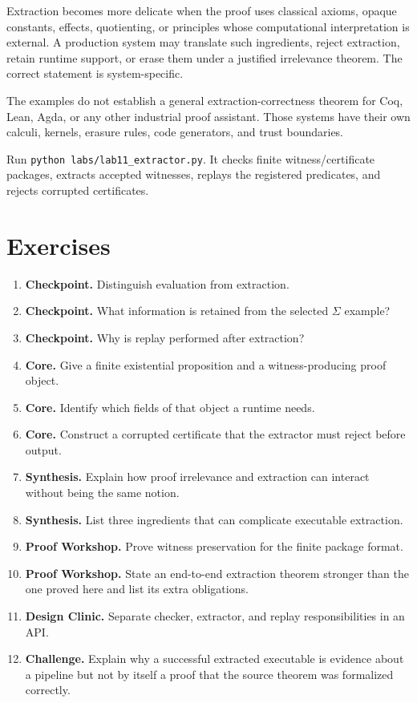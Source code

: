 Extraction becomes more delicate when the proof uses classical axioms, opaque constants, effects, quotienting, or principles whose computational interpretation is external. A production system may translate such ingredients, reject extraction, retain runtime support, or erase them under a justified irrelevance theorem. The correct statement is system-specific.



\begin{warningbox}
The examples do not establish a general extraction-correctness theorem for Coq, Lean, Agda, or any other industrial proof assistant. Those systems have their own calculi, kernels, erasure rules, code generators, and trust boundaries.
\end{warningbox}

\begin{labbox}
Run \texttt{python labs/lab11_extractor.py}. It checks finite witness/certificate packages, extracts accepted witnesses, replays the registered predicates, and rejects corrupted certificates.
\end{labbox}

\section*{Exercises}
\begin{enumerate}[label=\textbf{11.\arabic*.}]
\item \textbf{Checkpoint.} Distinguish evaluation from extraction.
\item \textbf{Checkpoint.} What information is retained from the selected $\Sigma$ example?
\item \textbf{Checkpoint.} Why is replay performed after extraction?
\item \textbf{Core.} Give a finite existential proposition and a witness-producing proof object.
\item \textbf{Core.} Identify which fields of that object a runtime needs.
\item \textbf{Core.} Construct a corrupted certificate that the extractor must reject before output.
\item \textbf{Synthesis.} Explain how proof irrelevance and extraction can interact without being the same notion.
\item \textbf{Synthesis.} List three ingredients that can complicate executable extraction.
\item \textbf{Proof Workshop.} Prove witness preservation for the finite package format.
\item \textbf{Proof Workshop.} State an end-to-end extraction theorem stronger than the one proved here and list its extra obligations.
\item \textbf{Design Clinic.} Separate checker, extractor, and replay responsibilities in an API.
\item \textbf{Challenge.} Explain why a successful extracted executable is evidence about a pipeline but not by itself a proof that the source theorem was formalized correctly.
\end{enumerate}
